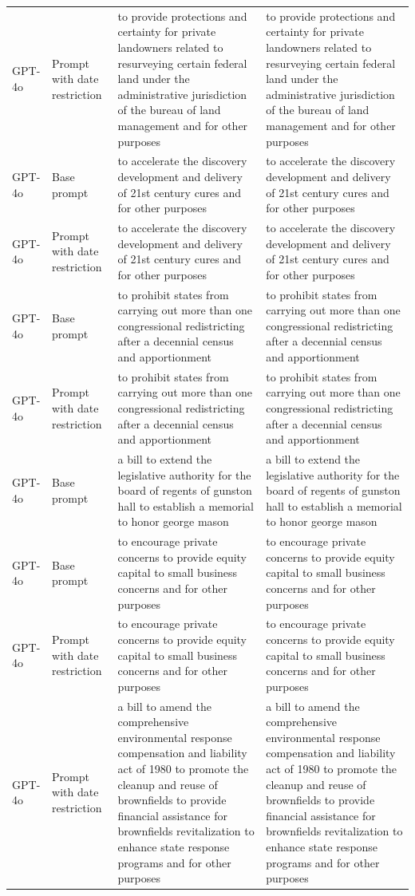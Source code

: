 \begin{longtable}{>{\raggedright\arraybackslash}p{1.4cm}>{\raggedright\arraybackslash}p{1.4cm}>{\raggedright\arraybackslash}p{5.5cm}>{\raggedright\arraybackslash}p{5.5cm}}
GPT-4o & Prompt with date restriction & to provide protections and certainty for private landowners related to resurveying certain federal land under the administrative jurisdiction of the bureau of land management and for other purposes & to provide protections and certainty for private landowners related to resurveying certain federal land under the administrative jurisdiction of the bureau of land management and for other purposes\\
GPT-4o & Base prompt & to accelerate the discovery development and delivery of 21st century cures and for other purposes & to accelerate the discovery development and delivery of 21st century cures and for other purposes\\
GPT-4o & Prompt with date restriction & to accelerate the discovery development and delivery of 21st century cures and for other purposes & to accelerate the discovery development and delivery of 21st century cures and for other purposes\\
GPT-4o & Base prompt & to prohibit states from carrying out more than one congressional redistricting after a decennial census and apportionment & to prohibit states from carrying out more than one congressional redistricting after a decennial census and apportionment\\
GPT-4o & Prompt with date restriction & to prohibit states from carrying out more than one congressional redistricting after a decennial census and apportionment & to prohibit states from carrying out more than one congressional redistricting after a decennial census and apportionment\\
GPT-4o & Base prompt & a bill to extend the legislative authority for the board of regents of gunston hall to establish a memorial to honor george mason & a bill to extend the legislative authority for the board of regents of gunston hall to establish a memorial to honor george mason\\
GPT-4o & Base prompt & to encourage private concerns to provide equity capital to small business concerns and for other purposes & to encourage private concerns to provide equity capital to small business concerns and for other purposes\\
GPT-4o & Prompt with date restriction & to encourage private concerns to provide equity capital to small business concerns and for other purposes & to encourage private concerns to provide equity capital to small business concerns and for other purposes\\
GPT-4o & Prompt with date restriction & a bill to amend the comprehensive environmental response compensation and liability act of 1980 to promote the cleanup and reuse of brownfields to provide financial assistance for brownfields revitalization to enhance state response programs and for other purposes & a bill to amend the comprehensive environmental response compensation and liability act of 1980 to promote the cleanup and reuse of brownfields to provide financial assistance for brownfields revitalization to enhance state response programs and for other purposes\\

\end{longtable}
